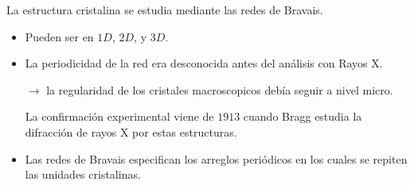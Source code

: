 La estructura cristalina se estudia mediante las redes de Bravais.

\begin{itemize}
    \item Pueden ser en $1D$, $2D$, y $3D$.
    \item La periodicidad de la red era desconocida antes del análisis con Rayos X.
    
    $\rightarrow$ la regularidad de los cristales macroscopicos debía seguir a nivel micro.
    
    La confirmación experimental viene de $1913$ cuando Bragg estudia la difracción de rayos X por estas estructuras.
    \item Las redes de Bravais especifican los arreglos periódicos en los cuales se repiten las unidades cristalinas.
\end{itemize}








